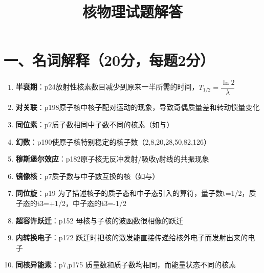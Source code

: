 \documentclass{article}
\title{核物理试题解答}
\author{}
\date{}
\begin{document}
\maketitle

\section*{一、名词解释（20分，每题2分）}
\begin{enumerate}
  \item \textbf{半衰期}：p24放射性核素数目减少到原来一半所需的时间，$T_{1/2} = \dfrac{\ln 2}{\lambda}$
  
  \item \textbf{对关联}：p198原子核中核子配对运动的现象，导致奇偶质量差和转动惯量变化
  
  \item \textbf{同位素}：p7质子数相同中子数不同的核素（如与）
  
  \item \textbf{幻数}：p190使原子核特别稳定的核子数（2,8,20,28,50,82,126）
  
  \item \textbf{穆斯堡尔效应}：p182原子核无反冲发射/吸收γ射线的共振现象
  
  \item \textbf{镜像核}：p7质子数与中子数互换的核（如与）
  
  \item \textbf{同位旋}：p19 为了描述核子的质子态和中子态引入的算符，量子数t=1/2，质子态的t3=+1/2，中子态的t3=-1/2
  
  \item \textbf{超容许跃迁}：p152 母核与子核的波函数很相像的跃迁
  
  \item \textbf{内转换电子}：p172 跃迁时把核的激发能直接传递给核外电子而发射出来的电子
  
  \item \textbf{同核异能素}：p7,p175 质量数和质子数均相同，而能量状态不同的核素
\end{enumerate}
\end{document}
